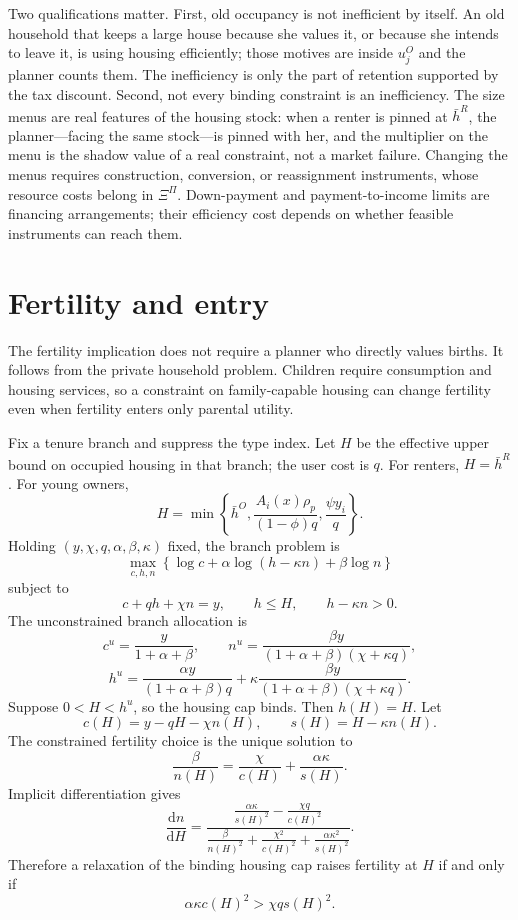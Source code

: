\documentclass[11pt]{article}
\newcommand{\dd}{\mathrm d}
\newcommand{\1}{\mathbf 1}
\begin{document}
Two qualifications matter. First, old occupancy is not inefficient by itself. An old household that keeps a large house because she values it, or because she intends to leave it, is using housing efficiently; those motives are inside $u_j^O$ and the planner counts them. The inefficiency is only the part of retention supported by the tax discount. Second, not every binding constraint is an inefficiency. The size menus are real features of the housing stock: when a renter is pinned at $\bar h^R$, the planner---facing the same stock---is pinned with her, and the multiplier on the menu is the shadow value of a real constraint, not a market failure. Changing the menus requires construction, conversion, or reassignment instruments, whose resource costs belong in $\Xi^\Pi$. Down-payment and payment-to-income limits are financing arrangements; their efficiency cost depends on whether feasible instruments can reach them.

\section{Fertility and entry}

The fertility implication does not require a planner who directly values births. It follows from the private household problem. Children require consumption and housing services, so a constraint on family-capable housing can change fertility even when fertility enters only parental utility.

Fix a tenure branch and suppress the type index. Let $H$ be the effective upper bound on occupied housing in that branch; the user cost is $q$. For renters, $H=\bar h^R$. For young owners,
\[
H=
\min\left\{
\bar h^O,
\frac{A_i(x)\rho_p}{(1-\phi)q},
\frac{\psi y_i}{q}
\right\}.
\]
Holding $(y,\chi,q,\alpha,\beta,\kappa)$ fixed, the branch problem is
\[
\max_{c,h,n}
\left\{
\log c+\alpha\log(h-\kappa n)+\beta\log n
\right\}
\]
subject to
\[
c+qh+\chi n=y,
\qquad
h\le H,
\qquad
h-\kappa n>0.
\]
The unconstrained branch allocation is
\[
c^u=\frac{y}{1+\alpha+\beta},
\qquad
n^u=
\frac{\beta y}{(1+\alpha+\beta)(\chi+\kappa q)},
\]
\[
h^u=
\frac{\alpha y}{(1+\alpha+\beta)q}
+
\kappa
\frac{\beta y}{(1+\alpha+\beta)(\chi+\kappa q)}.
\]
Suppose $0<H<h^u$, so the housing cap binds. Then $h(H)=H$. Let
\[
c(H)=y-qH-\chi n(H),
\qquad
s(H)=H-\kappa n(H).
\]
The constrained fertility choice is the unique solution to
\[
\frac{\beta}{n(H)}
=
\frac{\chi}{c(H)}
+
\frac{\alpha\kappa}{s(H)}.
\]
Implicit differentiation gives
\[
\frac{\dd n}{\dd H}
=
\frac{
\frac{\alpha\kappa}{s(H)^2}
-
\frac{\chi q}{c(H)^2}
}{
\frac{\beta}{n(H)^2}
+
\frac{\chi^2}{c(H)^2}
+
\frac{\alpha\kappa^2}{s(H)^2}
}.
\]
Therefore a relaxation of the binding housing cap raises fertility at $H$ if and only if
\[
\alpha\kappa c(H)^2>\chi q s(H)^2.
\]
\end{document}
